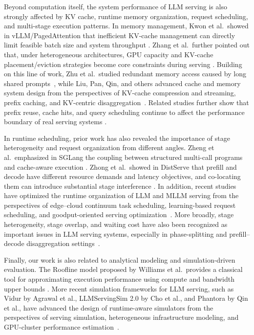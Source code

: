 \documentclass[a4paper,fleqn]{cas-dc}
\begin{document}
Beyond computation itself, the system performance of LLM serving is also strongly affected by KV cache, runtime memory organization, request scheduling, and multi-stage execution patterns. In memory management, Kwon et al.\ showed in vLLM/PagedAttention that inefficient KV-cache management can directly limit feasible batch size and system throughput \cite{kwon2023pagedattention}. Zhang et al.\ further pointed out that, under heterogeneous architectures, GPU capacity and KV-cache placement/eviction strategies become core constraints during serving \cite{zhang2025jenga}. Building on this line of work, Zhu et al.\ studied redundant memory access caused by long shared prompts~\cite{zhu2024relayattention}, while Liu, Pan, Qin, and others advanced cache and memory system design from the perspectives of KV-cache compression and streaming, prefix caching, and KV-centric disaggregation~\cite{liu2024cachegen,pan2025marconi,qin2025mooncake}. Related studies further show that prefix reuse, cache hits, and query scheduling continue to affect the performance boundary of real serving systems \cite{wang2025kvcachewild,dexter2026llm}.

In runtime scheduling, prior work has also revealed the importance of stage heterogeneity and request organization from different angles. Zheng et al.\ emphasized in SGLang the coupling between structured multi-call programs and cache-aware execution \cite{zheng2024sglang}. Zhong et al.\ showed in DistServe that prefill and decode have different resource demands and latency objectives, and co-locating them can introduce substantial stage interference \cite{zhong2024distserve}. In addition, recent studies have optimized the runtime organization of LLM and MLLM serving from the perspectives of edge--cloud continuum task scheduling, learning-based request scheduling, and goodput-oriented serving optimization~\cite{zhang2026eco_efficient_mllm_scheduling,fu2024efficient_llm_scheduling,hu2025bestserve}. More broadly, stage heterogeneity, stage overlap, and waiting cost have also been recognized as important issues in LLM serving systems, especially in phase-splitting and prefill--decode disaggregation settings~\cite{patel2024splitwise,zhong2024distserve}.

Finally, our work is also related to analytical modeling and simulation-driven evaluation. The Roofline model proposed by Williams et al.\ provides a classical tool for approximating execution performance using compute and bandwidth upper bounds \cite{williams2009roofline}. More recent simulation frameworks for LLM serving, such as Vidur by Agrawal et al., LLMServingSim 2.0 by Cho et al., and Phantora by Qin et al., have advanced the design of runtime-aware simulators from the perspectives of serving simulation, heterogeneous infrastructure modeling, and GPU-cluster performance estimation~\cite{agrawal2024vidur,cho2025llmservingsim2,qin2026phantora}.
\end{document}
